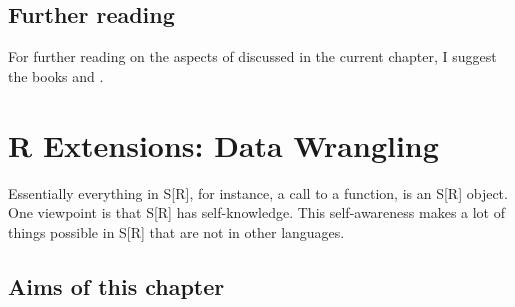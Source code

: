 \documentclass[krantz2]{krantz}\usepackage{knitr}
\begin{document}




\section{Further reading}
For further reading on the aspects of \Rlang discussed in the current chapter,
 I suggest the books  \autocite{Peng2022} and  \autocite{Matloff2011}.


















\chapter{R Extensions: Data Wrangling}\label{chap:R:data}

\begin{VF}
Essentially everything in S[R], for instance, a call to a function, is an S[R] object. One viewpoint is that S[R] has self-knowledge. This self-awareness makes a lot of things possible in S[R] that are not in other languages.

\nocite{Burns1998}
\end{VF}

\section{Aims of this chapter}
\end{document}

